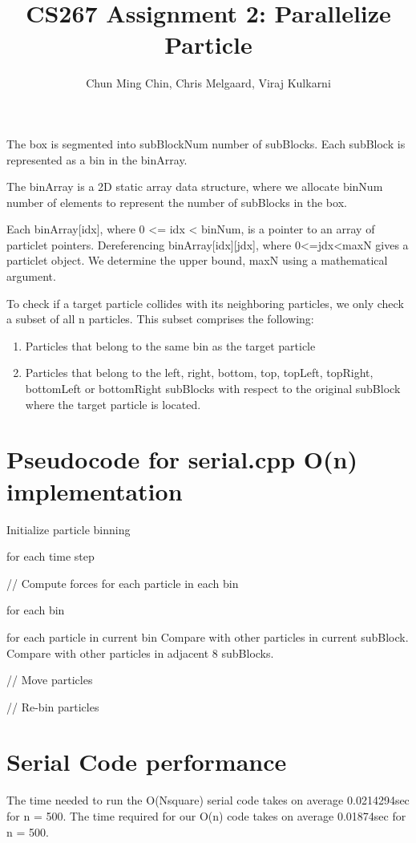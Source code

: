 \documentclass[11pt]{amsart}
\title{CS267 Assignment 2: Parallelize Particle}
\author{Chun Ming Chin, Chris Melgaard, Viraj Kulkarni }
\begin{document}
\maketitle



The box is segmented into subBlockNum number of subBlocks. Each subBlock is represented as a bin in the binArray.

The binArray is a 2D static array data structure, where we allocate binNum number of elements to represent the number of subBlocks in the box. 

Each binArray[idx], where 0 <= idx < binNum, is a pointer to an array of particlet pointers. Dereferencing binArray[idx][jdx], where 0<=jdx<maxN gives a particlet object. We determine the upper bound, maxN using a mathematical argument. 

To check if a target particle collides with its neighboring particles, we only check a subset of all n particles. This subset comprises the following: 
\begin{enumerate}
\item Particles that belong to the same bin as the target particle
\item Particles that belong to the left, right, bottom, top, topLeft, topRight, bottomLeft or bottomRight subBlocks with respect to the original subBlock where the target particle is located. 
\end{enumerate}


\section{Pseudocode for serial.cpp O(n) implementation}

Initialize particle binning

for each time step {

   // Compute forces for each particle in each bin
   
   for each bin {
   
      for each particle in current bin {
         Compare with other particles in current subBlock.
         Compare with other particles in adjacent 8 subBlocks.
      }    
   }
   
   // Move particles
   
   // Re-bin particles
   
}

\section{Serial Code performance}

The time needed to run the O(Nsquare) serial code takes on average 0.0214294sec for n = 500.
The time required for our O(n) code takes on average 0.01874sec for n = 500.
\end{document}
